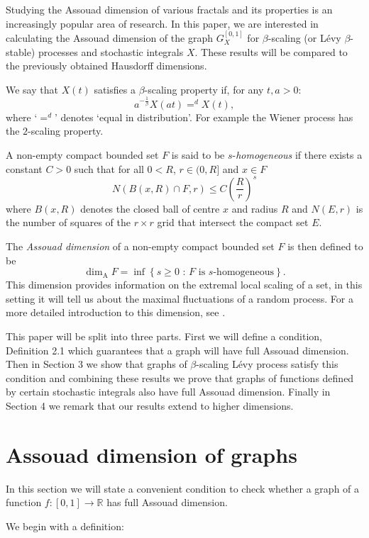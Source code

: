 \documentclass{amsart}
\newcommand{\Assouad}{\dim_{\mathrm{A}}}
\begin{document}
Studying the Assouad dimension of various fractals and its properties is an increasingly popular area of research. In this paper, we are interested in calculating the Assouad dimension of the graph $G_X^{[0,1]}$ for $\beta$-scaling (or L\'{e}vy $\beta$-stable) processes and stochastic integrals $X$. These results will be compared to the previously obtained Hausdorff dimensions.

We say that $X(t)$ satisfies a $\beta$-scaling property if, for any $t,a>0$:
\[
a^{-\frac{1}{\beta}}X(at)=^d X(t),
\]
where `$=^d$' denotes `equal in distribution'.
For example the Wiener process has the $2$-scaling property.
 
A non-empty compact bounded set $F$ is said to be $s$-\textit{homogeneous} if there exists a constant $C>0$ such that for all $0<R$, $r\in (0,R]$ and $x\in F$
\[
N(B(x,R) \cap F, r) \le C\left(\frac{R}{r}\right)^s
\]
where $B(x,R)$ denotes the closed ball of centre $x$ and radius $R$ and $N(E,r)$ is the number of squares of the $r\times r$ grid that intersect the compact set $E$. 

The \emph{Assouad dimension} of a non-empty compact bounded set $F$ is then defined to be 
\[
\Assouad F = \inf \left\{ s \ge 0 \, \, \colon \, F \text{ is } s\text{-homogeneous} \right\}.
\]
This dimension provides information on the extremal local scaling of a set, in this setting it will tell us about the maximal fluctuations of a random process. For a more detailed introduction to this dimension, see \cite{Fr, Ro}. 

This paper will be split into three parts. First we will define a condition, Definition 2.1 which guarantees that a graph will have full Assouad dimension. Then in Section 3 we show that graphs of $\beta$-scaling L\'evy process satisfy this condition and combining these results we prove that graphs of functions defined by certain stochastic integrals also have full Assouad dimension. Finally in Section 4 we remark that our results extend to higher dimensions.

\section{Assouad dimension of graphs}
In this section we will state a convenient condition to check whether a graph of a function $f:[0,1]\to\mathbb{R}$ has full Assouad dimension.

We begin with a definition:
\end{document}
